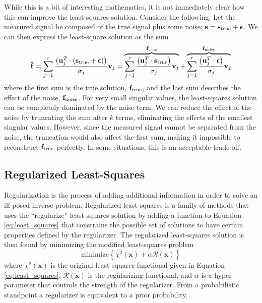 While this is a bit of interesting mathematics, it is not immediately clear how this can improve the least-squares solution. Consider the following. Let the measured signal be composed of the true signal plus some noise: $\mathbf{s} = \mathbf{s}_{\rm{true}} + \boldsymbol{\epsilon}$. We can then express the least-square solution as the sum
\begin{equation}\label{eq:f_svd_sum}
    \mathbf{\hat{f}} = \sum_{j=1}^r \frac{\left(\mathbf{u}_j^T \cdot (\mathbf{s}_{\rm{true}} + \boldsymbol{\epsilon}) \right)}{\sigma_j} \mathbf{v}_j = \overbrace{\sum_{j=1}^r \frac{\left(\mathbf{u}_j^T \cdot \mathbf{s}_{\rm{true}} \right)}{\sigma_j} \mathbf{v}_j}^{\mathbf{f}_{\rm{true}}} + \overbrace{\sum_{j=1}^r \frac{\left(\mathbf{u}_j^T \cdot \boldsymbol{\epsilon} \right)}{\sigma_j} \mathbf{v}_j}^{\mathbf{f}_{\rm{noise}}}
\end{equation}
where the first sum is the true solution, $\mathbf{f}_{\rm{true}}$, and the last sum describes the effect of the noise, $\mathbf{f}_{\rm{noise}}$. For very small singular values, the least-squares solution can be completely dominated by the noise term. We can reduce the effect of the noise by truncating the sum after $k$ terms, eliminating the effects of the smallest singular values. However, since the measured signal cannot be separated from the noise, the truncation would also affect the first sum, making it impossible to reconstruct $\mathbf{f}_{\rm{true}}$ perfectly. In some situations, this is an acceptable trade-off. 

\subsection{Regularized Least-Squares}
Regularization is the process of adding additional information in order to solve an ill-posed inverse problem. Regularized least-squares is a family of methods that uses the ``regularize'' least-squares solution by adding a function to Equation \ref{eq:least_squares} that constrains the possible set of solutions to have certain properties defined by the regularizer. The regularized least-squares solution is then found by minimizing the modified least-squares problem
\begin{equation}\label{eq:regularized_least_squares}
    \mathrm{minimize} \left \lbrace \chi^2(\mathbf{x}) + \alpha \mathcal{R}(\mathbf{x}) \right \rbrace 
\end{equation}
where $\chi^2(\mathbf{x})$ is the original least-squares functional given in Equation \ref{eq:least_squares}, $\mathcal{R}(\mathbf{x})$ is the regularizing functional, and $\alpha$ is a hyper-parameter that controls the strength of the regularizer. From a probabilistic standpoint a regularizer is equivalent to a prior probability. 

